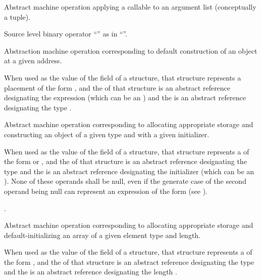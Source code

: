 Abstract machine operation applying a callable to an argument list (conceptually a tuple).

Source level binary operator ``\code{[]}'' as in ``''.

Abstraction machine operation corresponding to default construction of an object at a given address.

When used as the value of the  field of a  structure, 
that structure reprsents a placement  of the form , 
and the  of that structure is an abstract reference designating the expression  
(which can be an ) and the  is an abstract reference designating the type .


Abstract machine operation corresponding to allocating appropriate storage and constructing an object of a given type 
and with a given initializer.

When used as the value of the  field of a  structure, 
that structure reprsents a  of the form  or , 
and the  of that structure is an abstract reference designating the type  
and the  is an abstract reference designating the initializer 
(which can be an ).  None of these operands shall be null, even if the generate case
of the second operand being null can represent an expression of the form  
(see ).

.

Abstract machine operation corresponding to allocating appropriate storage and default-initializing an array of a given element type and length. 

When used as the value of the  field of a  structure, 
that structure represents a  of the form , 
and the  of that structure is an abstract reference designating the type  
and the  is an abstract reference designating the length .

